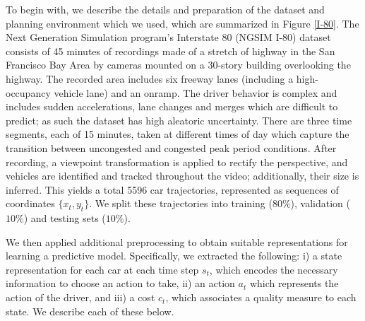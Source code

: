 \documentclass{article} %
\begin{document}
To begin with, we describe the details and preparation of the dataset and planning environment which we used, which are summarized in Figure \ref{I-80}.
The Next Generation Simulation program's Interstate 80 (NGSIM I-80) dataset \citep{NGSIM} consists of 45 minutes of recordings made of a stretch of highway in the San Francisco Bay Area by cameras mounted on a 30-story building overlooking the highway. The recorded area includes six freeway lanes (including a high-occupancy vehicle lane) and an onramp.
The driver behavior is complex and includes sudden accelerations, lane changes and merges which are difficult to predict; as such the dataset has high aleatoric uncertainty.
There are three time segments, each of 15 minutes, taken at different times of day which capture the transition between uncongested and congested peak period conditions.
After recording, a viewpoint transformation is applied to rectify the perspective, and vehicles are identified and tracked throughout the video; additionally, their size is inferred.
This yields a total 5596 car trajectories, represented as sequences of coordinates $\{x_t, y_t\}$. We split these trajectories into training ($80\%$), validation ($10\%$) and testing sets ($10\%$).

We then applied additional preprocessing to obtain suitable representations for learning a predictive model.
Specifically, we extracted the following: i) a state representation for each car at each time step $s_t$, which encodes the necessary information to choose an action to take, ii) an action $a_t$ which represents the action of the driver, and iii) a cost $c_t$, which associates a quality measure to each state. We describe each of these below.
\end{document}
